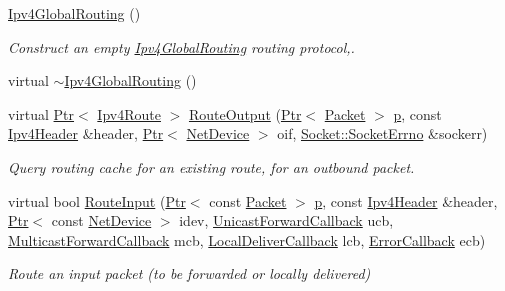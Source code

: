 \begin{DoxyCompactItemize}
\item 
\hyperlink{classns3_1_1Ipv4GlobalRouting_a7cefb1b7e138c5756e3bda9de707f756}{Ipv4\+Global\+Routing} ()
\begin{DoxyCompactList}\small\item\em Construct an empty \hyperlink{classns3_1_1Ipv4GlobalRouting}{Ipv4\+Global\+Routing} routing protocol,. \end{DoxyCompactList}\item 
virtual \hyperlink{classns3_1_1Ipv4GlobalRouting_ac7fa4fb9540f1be32954a0226b24e2f2}{$\sim$\+Ipv4\+Global\+Routing} ()
\item 
virtual \hyperlink{classns3_1_1Ptr}{Ptr}$<$ \hyperlink{classns3_1_1Ipv4Route}{Ipv4\+Route} $>$ \hyperlink{classns3_1_1Ipv4GlobalRouting_a569e54ce6542c3b88305140cce134d15}{Route\+Output} (\hyperlink{classns3_1_1Ptr}{Ptr}$<$ \hyperlink{classns3_1_1Packet}{Packet} $>$ \hyperlink{lte__link__budget__x2__handover__measures_8m_ac9de518908a968428863f829398a4e62}{p}, const \hyperlink{classns3_1_1Ipv4Header}{Ipv4\+Header} \&header, \hyperlink{classns3_1_1Ptr}{Ptr}$<$ \hyperlink{classns3_1_1NetDevice}{Net\+Device} $>$ oif, \hyperlink{classns3_1_1Socket_ada1328c5ae0c28cb2a982caf8f6d6cca}{Socket\+::\+Socket\+Errno} \&sockerr)
\begin{DoxyCompactList}\small\item\em Query routing cache for an existing route, for an outbound packet. \end{DoxyCompactList}\item 
virtual bool \hyperlink{classns3_1_1Ipv4GlobalRouting_a2d027555864ab2f6a9f028f38a65a8e7}{Route\+Input} (\hyperlink{classns3_1_1Ptr}{Ptr}$<$ const \hyperlink{classns3_1_1Packet}{Packet} $>$ \hyperlink{lte__link__budget__x2__handover__measures_8m_ac9de518908a968428863f829398a4e62}{p}, const \hyperlink{classns3_1_1Ipv4Header}{Ipv4\+Header} \&header, \hyperlink{classns3_1_1Ptr}{Ptr}$<$ const \hyperlink{classns3_1_1NetDevice}{Net\+Device} $>$ idev, \hyperlink{classns3_1_1Ipv4RoutingProtocol_a3453a85764cbbb1e704da7e919aa5d19}{Unicast\+Forward\+Callback} ucb, \hyperlink{classns3_1_1Ipv4RoutingProtocol_a26e76f7a555462e6c08fceda64a99d58}{Multicast\+Forward\+Callback} mcb, \hyperlink{classns3_1_1Ipv4RoutingProtocol_aa6ffa0159cb143daa3c46d2ba69bb1b9}{Local\+Deliver\+Callback} lcb, \hyperlink{classns3_1_1Ipv4RoutingProtocol_a0348285418c30d5021b08f7a68af21ea}{Error\+Callback} ecb)
\begin{DoxyCompactList}\small\item\em Route an input packet (to be forwarded or locally delivered) \end{DoxyCompactList}\item 

\end{DoxyCompactItemize}
